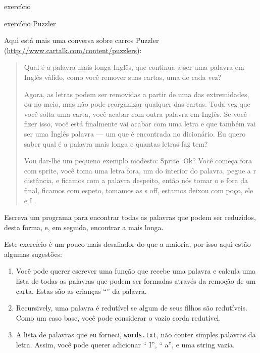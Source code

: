 \documentclass[10pt]{book}
\begin{document}
\begin{v erbatim}
\begin{}
\end{} exercício



\begin{} exercício
\index{} Puzzler

Aqui está mais uma conversa sobre carros Puzzler
(\url{http://www.cartalk.com/content/puzzlers}):

\begin{quote}
Qual é a palavra mais longa Inglês, que continua a ser uma palavra em Inglês válido,
como você remover suas cartas, uma de cada vez?

Agora, as letras podem ser removidas a partir de uma das extremidades, ou no meio, mas
não pode reorganizar qualquer das cartas. Toda vez que você solta uma carta, você
acabar com outra palavra em Inglês. Se você fizer isso, você está finalmente
vai acabar com uma letra e que também vai ser uma
Inglês palavra --- um que é encontrada no dicionário. Eu quero saber
qual é a palavra mais longa e quantas letras faz
tem?

Vou dar-lhe um pequeno exemplo modesto: Sprite. Ok? Você começa
fora com sprite, você toma uma letra fora, um do interior do
palavra, pegue a r distância, e ficamos com a palavra despeito, então nós
tomar o e fora da final, ficamos com espeto, tomamos as s off, estamos
deixou com poço, ele e I.
\end{quote}

Escreva um programa para encontrar todas as palavras que podem ser reduzidos, desta forma,
e, em seguida, encontrar a mais longa.

Este exercício é um pouco mais desafiador do que a maioria, por isso aqui estão
algumas sugestões:

\begin{enumerate}

\item Você pode querer escrever uma função que recebe uma palavra e
  calcula uma lista de todas as palavras que podem ser formadas através da remoção de um
  carta. Estas são as crianças ``'' da palavra.

\item Recursively, uma palavra é redutível se algum de seus filhos
são redutíveis. Como um caso base, você pode considerar o vazio
corda redutível.

\item A lista de palavras que eu forneci, {\tt words.txt}, não
conter simples palavras da letra. Assim, você pode querer adicionar
`` I'', `` a'', e uma string vazia.


\end{enumerate}
\end{}
\end{v erbatim}
\end{document}
